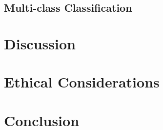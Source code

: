 \documentclass[11pt,a4paper,onecolumn]{article}
\begin{document}
\subsection{Multi-class Classification}

\section{Discussion}

\section{Ethical Considerations}

\section{Conclusion}

%
%
\end{document}
